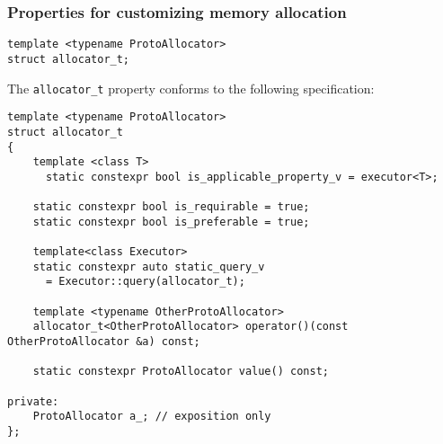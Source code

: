 \documentclass[a4paper,12pt,notitlepage,twoside,openright]{article}
\begin{document}
\hypertarget{properties-for-customizing-memory-allocation}{%
\subsubsection{Properties for customizing memory
allocation}\label{properties-for-customizing-memory-allocation}}

\begin{verbatim}
template <typename ProtoAllocator>
struct allocator_t;
\end{verbatim}

The \texttt{allocator_t} property conforms to the following
specification:

\begin{verbatim}
template <typename ProtoAllocator>
struct allocator_t
{
    template <class T>
      static constexpr bool is_applicable_property_v = executor<T>;

    static constexpr bool is_requirable = true;
    static constexpr bool is_preferable = true;

    template<class Executor>
    static constexpr auto static_query_v
      = Executor::query(allocator_t);

    template <typename OtherProtoAllocator>
    allocator_t<OtherProtoAllocator> operator()(const OtherProtoAllocator &a) const;

    static constexpr ProtoAllocator value() const;

private:
    ProtoAllocator a_; // exposition only
};
\end{verbatim}
\end{document}
